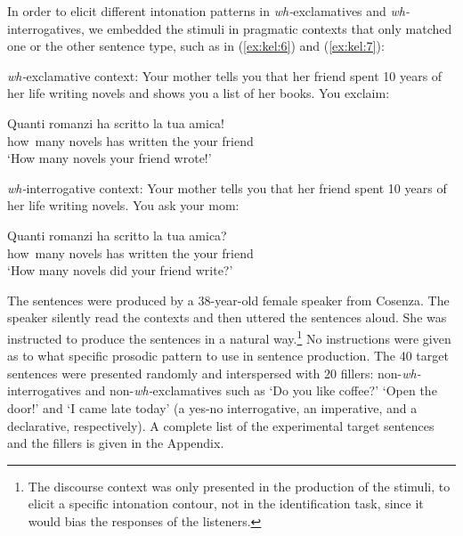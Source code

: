 \documentclass[output=paper]{langsci/langscibook}
\begin{document}

In order to elicit different intonation patterns in \textit{wh-}exclamatives and \textit{wh-}interrogatives, we embedded the stimuli in pragmatic contexts that only matched one or the other sentence type, such as in (\ref{ex:kel:6}) and (\ref{ex:kel:7}):


\ea\label{ex:kel:6}
\textit{wh-}exclamative context: Your mother tells you that her friend spent 10 years of her life writing novels and shows you a list of her books. You exclaim:

\gll Quanti  romanzi   ha  scritto   la   tua    amica! \\
     how~many   novels has written   the  your friend\\
\glt ‘How many novels your friend wrote!’
\z


\ea\label{ex:kel:7}
\textit{wh-}interrogative context: Your mother tells you that her friend spent 10 years of her life writing novels. You ask your mom:

\gll Quanti   romanzi  ha  scritto   la   tua    amica?    \\
     how~many novels   has written   the your friend\\
\glt ‘How many novels did your friend write?’
\z


The sentences were produced by a 38-year-old female speaker from Cosenza. The speaker silently read the contexts and then uttered the sentences aloud. She was instructed to produce the sentences in a natural way.\footnote{The discourse context was only presented in the production of the stimuli, to elicit a specific intonation contour, not in the identification task, since it would bias the responses of the listeners.} No instructions were given as to what specific prosodic pattern to use in sentence production. The 40 target sentences were presented randomly and interspersed with 20 fillers: non-\textit{wh-}interrogatives and non-\textit{wh-}exclamatives such as ‘Do you like coffee?’ ‘Open the door!’ and ‘I came late today’ (a yes-no interrogative, an imperative, and a declarative, respectively). A complete list of the experimental target sentences and the fillers is given in the Appendix.
\end{document}
